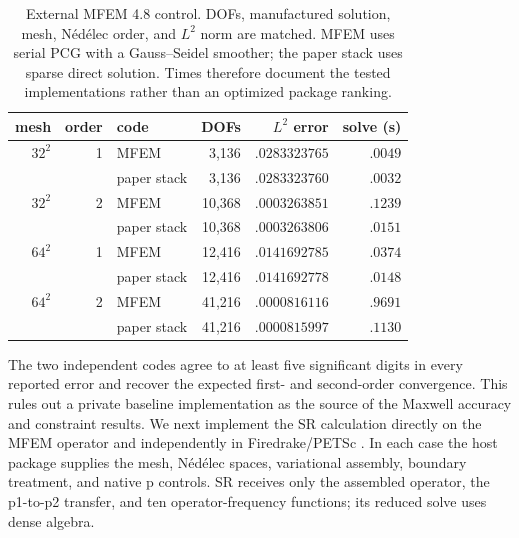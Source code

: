\documentclass[11pt]{article}
\numberwithin{algorithm}{section}
\theoremstyle{definition}\newtheorem{definition}[theorem]{Definition}
\theoremstyle{remark}\newtheorem{remark}[theorem]{Remark}
\begin{document}
\begin{table}[H]
\centering
\caption{External MFEM 4.8 control.  DOFs, manufactured solution, mesh,
N\'ed\'elec order, and $L^2$ norm are matched.  MFEM uses serial PCG with a
Gauss--Seidel smoother; the paper stack uses sparse direct solution.  Times
therefore document the tested implementations rather than an optimized package
ranking.}
\label{tab:mfem-external-control}
\begin{tabular}{rrlrrr}
\toprule
mesh & order & code & DOFs & $L^2$ error & solve (s)\\
\midrule
$32^2$ & 1 & MFEM        & 3,136  & $.0283323765$ & $.0049$\\
       &   & paper stack & 3,136  & $.0283323760$ & $.0032$\\
$32^2$ & 2 & MFEM        & 10,368 & $.0003263851$ & $.1239$\\
       &   & paper stack & 10,368 & $.0003263806$ & $.0151$\\
$64^2$ & 1 & MFEM        & 12,416 & $.0141692785$ & $.0374$\\
       &   & paper stack & 12,416 & $.0141692778$ & $.0148$\\
$64^2$ & 2 & MFEM        & 41,216 & $.0000816116$ & $.9691$\\
       &   & paper stack & 41,216 & $.0000815997$ & $.1130$\\
\bottomrule
\end{tabular}
\end{table}

The two independent codes agree to at least five significant digits in every
reported error and recover the expected first- and second-order convergence.
This rules out a private baseline implementation as the source of the Maxwell
accuracy and constraint results.  We next implement the SR calculation
directly on the MFEM operator and independently in Firedrake/PETSc
\cite{rathgeber2016firedrake}.  In each case the host package supplies the
mesh, N\'ed\'elec spaces, variational assembly, boundary treatment, and native
p controls.  SR receives only the assembled operator, the p1-to-p2 transfer,
and ten operator-frequency functions; its reduced solve uses dense algebra.
\end{document}
